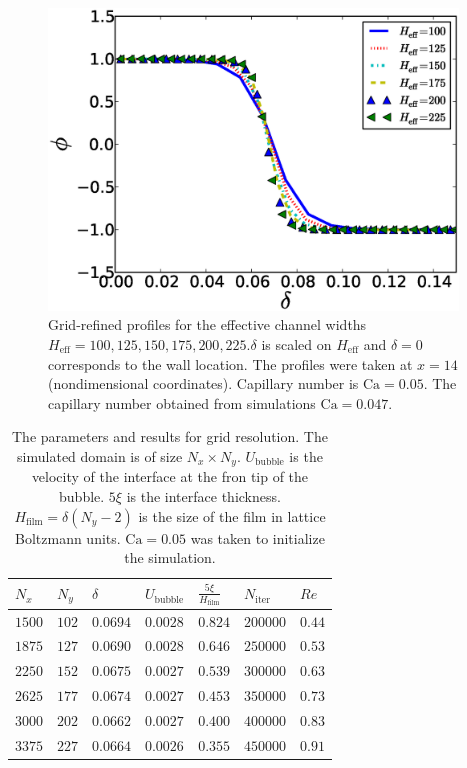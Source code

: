 \documentclass[preprint,12pt]{elsarticle}
\newcommand{\Ca}{\mathrm{Ca}}
\begin{document}
\begin{figure}
\includegraphics[width=0.97\textwidth]{Figures/Grid/norm_grid_profs.eps}
\caption{Grid-refined profiles for the effective
channel widths
$H_{\mathrm{eff}}=100,125,150,175,200,225$.$\delta$ is scaled on $H_{\mathrm{eff}}$ and $\delta=0$
corresponds to the wall location. The profiles were taken at $x=14$ (nondimensional coordinates).
Capillary number is $\Ca=0.05$. The capillary number obtained from simulations $\Ca=0.047$. 
\label{fig:grid:profiles}}
\end{figure}
\begin{table}
\begin{tabularx}{0.97\textwidth}{|X|X|X|X|X|X|X|}
\hline
$N_x$&$N_y$&$\delta$&$U_\mathrm{bubble}$&$\frac{5\xi}{H_{\mathrm{film}}}$&$N_\mathrm{iter}$&{
\color{red} $Re$}\\
\hline
$1500$&$102$&$0.0694$&$0.0028$&$0.824$&$200000$&$0.44$\\
\hline
$1875$&$127$&$0.0690$&$0.0028$&$0.646$&$250000$&$0.53$\\
\hline
$2250$&$152$&$0.0675$&$0.0027$&$0.539$&$300000$&$0.63$\\
\hline
$2625$&$177$&$0.0674$&$0.0027$&$0.453$&$350000$&$0.73$\\
\hline
$3000$&$202$&$0.0662$&$0.0027$&$0.400$&$400000$&$0.83$\\
\hline
$3375$&$227$&$0.0664$&$0.0026$&$0.355$&$450000$&$0.91$\\
\hline
\end{tabularx}
\caption{The parameters and results for grid resolution. The simulated domain is
of size $N_x \times N_y$. $U_\mathrm{bubble}$ is the velocity of the interface at the fron tip of
the bubble.  $5\xi$ is the interface thickness. $H_{\mathrm{film}}=\delta (N_y-2)$ is the size of
the film in
lattice Boltzmann units. $\Ca=0.05$ was taken to initialize the simulation.
\label{table:parameters:grid:refinement}}
\end{table}
\end{document}
